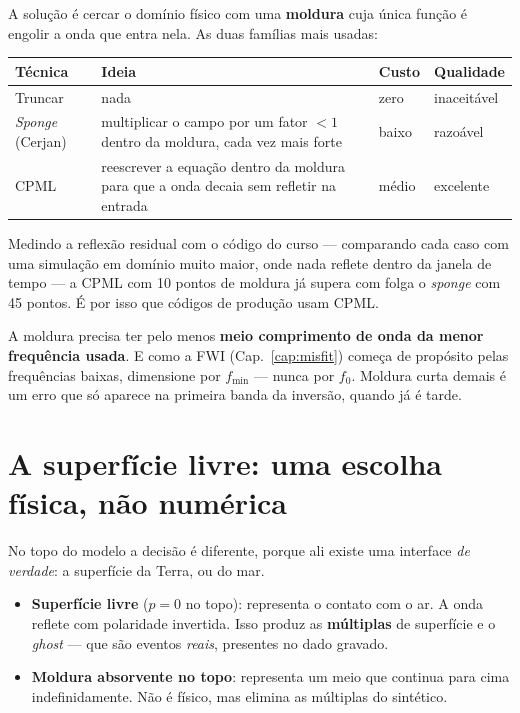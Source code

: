 \documentclass[11pt,a4paper,oneside]{report}
\begin{document}
A solu\c{c}\~ao \'e cercar o dom\'inio f\'isico com uma \textbf{moldura} cuja
\'unica fun\c{c}\~ao \'e engolir a onda que entra nela. As duas fam\'ilias
mais usadas:

\begin{center}
\begin{tabular}{@{}lp{5.0cm}ll@{}}
\toprule
\textbf{T\'ecnica} & \textbf{Ideia} & \textbf{Custo} & \textbf{Qualidade} \\
\midrule
Truncar & nada & zero & inaceit\'avel \\
\emph{Sponge} (Cerjan) & multiplicar o campo por um fator $<1$ dentro da
moldura, cada vez mais forte & baixo & razo\'avel \\
CPML & reescrever a equa\c{c}\~ao dentro da moldura para que a onda
decaia sem refletir na entrada & m\'edio & excelente \\
\bottomrule
\end{tabular}
\end{center}

Medindo a reflex\~ao residual com o c\'odigo do curso --- comparando cada
caso com uma simula\c{c}\~ao em dom\'inio muito maior, onde nada reflete
dentro da janela de tempo --- a CPML com 10 pontos de moldura j\'a supera com
folga o \emph{sponge} com 45 pontos. \'E por isso que c\'odigos de
produ\c{c}\~ao usam CPML.

\begin{pratica}
A moldura precisa ter pelo menos \textbf{meio comprimento de onda da menor
frequ\^encia usada}. E como a FWI (Cap.~\ref{cap:misfit}) come\c{c}a de
prop\'osito pelas frequ\^encias baixas, dimensione por $f_{\min}$ --- nunca
por $f_0$. Moldura curta demais \'e um erro que s\'o aparece na primeira banda
da invers\~ao, quando j\'a \'e tarde.
\end{pratica}

\section{A superf\'icie livre: uma escolha f\'isica, n\~ao num\'erica}

No topo do modelo a decis\~ao \'e diferente, porque ali existe uma interface
\emph{de verdade}: a superf\'icie da Terra, ou do mar.

\begin{itemize}[leftmargin=*]
\item \textbf{Superf\'icie livre} ($p=0$ no topo): representa o contato com o
ar. A onda reflete com polaridade invertida. Isso produz as
\textbf{m\'ultiplas} de superf\'icie e o \emph{ghost} --- que s\~ao eventos
\emph{reais}, presentes no dado gravado.
\item \textbf{Moldura absorvente no topo}: representa um meio que continua
para cima indefinidamente. N\~ao \'e f\'isico, mas elimina as m\'ultiplas do
sint\'etico.
\end{itemize}
\end{document}
